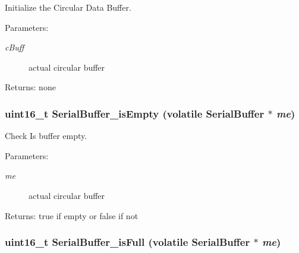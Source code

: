 Initialize the Circular Data Buffer. \begin{Desc}
\item[Parameters:]
\begin{description}
\item[{\em cBuff}]actual circular buffer \end{description}
\end{Desc}
\begin{Desc}
\item[Returns:]none \end{Desc}
\hypertarget{group___serial_g1e7c23fc0a9712d2e3097154c8b85a6f}{
\subsubsection[{SerialBuffer\_\-isEmpty}]{\setlength{\rightskip}{0pt plus 5cm}uint16\_\-t SerialBuffer\_\-isEmpty (volatile {\bf SerialBuffer} $\ast$ {\em me})}}
\label{group___serial_g1e7c23fc0a9712d2e3097154c8b85a6f}


Check Is buffer empty. \begin{Desc}
\item[Parameters:]
\begin{description}
\item[{\em me}]actual circular buffer \end{description}
\end{Desc}
\begin{Desc}
\item[Returns:]true if empty or false if not \end{Desc}
\hypertarget{group___serial_g522e245db6b26c1b5dc72ec08d84e7d0}{
\subsubsection[{SerialBuffer\_\-isFull}]{\setlength{\rightskip}{0pt plus 5cm}uint16\_\-t SerialBuffer\_\-isFull (volatile {\bf SerialBuffer} $\ast$ {\em me})}}
\label{group___serial_g522e245db6b26c1b5dc72ec08d84e7d0}


